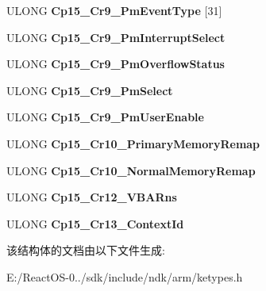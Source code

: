 \begin{DoxyCompactItemize}
\mbox{\label{struct___k_a_r_m___a_r_c_h___s_t_a_t_e_af2ea21c2f3fe13d04ff7a44adc1fb6e1}} 
U\+L\+O\+NG {\bfseries Cp15\+\_\+\+Cr9\+\_\+\+Pm\+Event\+Type} \mbox{[}31\mbox{]}
\item 
\mbox{\label{struct___k_a_r_m___a_r_c_h___s_t_a_t_e_a91efc770259c8337896559ed4ae850e5}} 
U\+L\+O\+NG {\bfseries Cp15\+\_\+\+Cr9\+\_\+\+Pm\+Interrupt\+Select}
\item 
\mbox{\label{struct___k_a_r_m___a_r_c_h___s_t_a_t_e_ac4662d9325167441913775f0d0bae2f8}} 
U\+L\+O\+NG {\bfseries Cp15\+\_\+\+Cr9\+\_\+\+Pm\+Overflow\+Status}
\item 
\mbox{\label{struct___k_a_r_m___a_r_c_h___s_t_a_t_e_a9541a885fc270001fafeee9b4a215c1f}} 
U\+L\+O\+NG {\bfseries Cp15\+\_\+\+Cr9\+\_\+\+Pm\+Select}
\item 
\mbox{\label{struct___k_a_r_m___a_r_c_h___s_t_a_t_e_a34ef6f1241f0f43928e23b5fcf78be55}} 
U\+L\+O\+NG {\bfseries Cp15\+\_\+\+Cr9\+\_\+\+Pm\+User\+Enable}
\item 
\mbox{\label{struct___k_a_r_m___a_r_c_h___s_t_a_t_e_a8490093d85f3506aa25fec18084a50f6}} 
U\+L\+O\+NG {\bfseries Cp15\+\_\+\+Cr10\+\_\+\+Primary\+Memory\+Remap}
\item 
\mbox{\label{struct___k_a_r_m___a_r_c_h___s_t_a_t_e_ac7eebf3daa58404847fc49c44aae2263}} 
U\+L\+O\+NG {\bfseries Cp15\+\_\+\+Cr10\+\_\+\+Normal\+Memory\+Remap}
\item 
\mbox{\label{struct___k_a_r_m___a_r_c_h___s_t_a_t_e_ae61d4ccd3e7073ecefd90f0e59a5e6ab}} 
U\+L\+O\+NG {\bfseries Cp15\+\_\+\+Cr12\+\_\+\+V\+B\+A\+Rns}
\item 
\mbox{\label{struct___k_a_r_m___a_r_c_h___s_t_a_t_e_ae9e5283a24489937e0a0138fe3b9aa5f}} 
U\+L\+O\+NG {\bfseries Cp15\+\_\+\+Cr13\+\_\+\+Context\+Id}
\end{DoxyCompactItemize}


该结构体的文档由以下文件生成\+:\begin{DoxyCompactItemize}
\item 
E\+:/\+React\+O\+S-\/0../sdk/include/ndk/arm/ketypes.\+h\end{DoxyCompactItemize}
